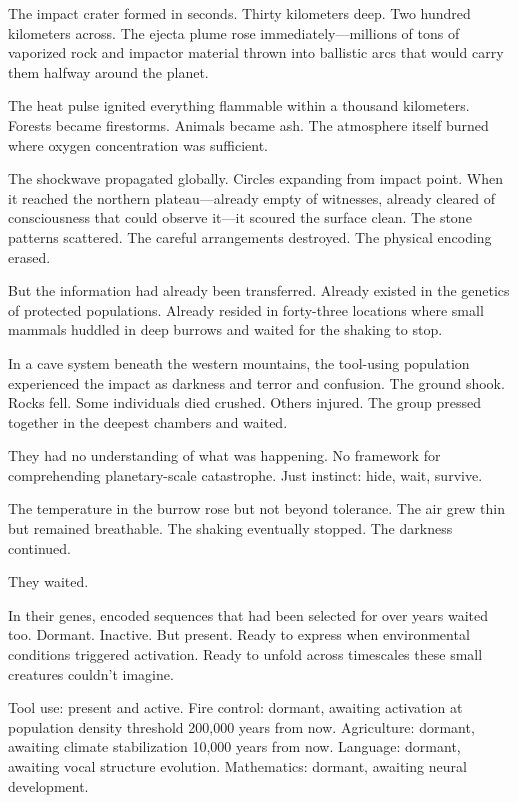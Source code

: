 The impact crater formed in seconds. Thirty kilometers deep. Two hundred kilometers across. The ejecta plume rose immediately—millions of tons of vaporized rock and impactor material thrown into ballistic arcs that would carry them halfway around the planet.

The heat pulse ignited everything flammable within a thousand kilometers. Forests became firestorms. Animals became ash. The atmosphere itself burned where oxygen concentration was sufficient.

The shockwave propagated globally. Circles expanding from impact point. When it reached the northern plateau—already empty of witnesses, already cleared of consciousness that could observe it—it scoured the surface clean. The stone patterns scattered. The careful arrangements destroyed. The physical encoding erased.

But the information had already been transferred. Already existed in the genetics of protected populations. Already resided in forty-three locations where small mammals huddled in deep burrows and waited for the shaking to stop.

\scenebreak

In a cave system beneath the western mountains, the tool-using population experienced the impact as darkness and terror and confusion. The ground shook. Rocks fell. Some individuals died crushed. Others injured. The group pressed together in the deepest chambers and waited.

They had no understanding of what was happening. No framework for comprehending planetary-scale catastrophe. Just instinct: hide, wait, survive.

The temperature in the burrow rose but not beyond tolerance. The air grew thin but remained breathable. The shaking eventually stopped. The darkness continued.

They waited.

In their genes, encoded sequences that had been selected for over years waited too. Dormant. Inactive. But present. Ready to express when environmental conditions triggered activation. Ready to unfold across timescales these small creatures couldn't imagine.

Tool use: present and active.
Fire control: dormant, awaiting activation at population density threshold 200,000 years from now.
Agriculture: dormant, awaiting climate stabilization 10,000 years from now.
Language: dormant, awaiting vocal structure evolution.
Mathematics: dormant, awaiting neural development.

